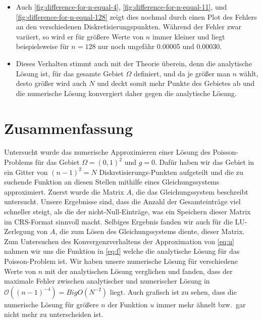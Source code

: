 \documentclass{scrartcl}
\newcommand\BigO{\mathcal{O}}
\begin{document}
\begin{itemize}
    \item Auch \autoref{fig:difference-for-n-equal-4},
          \autoref{fig:difference-for-n-equal-11}, und
          \autoref{fig:difference-for-n-equal-128} zeigt dies nochmal durch
          einen Plot des Fehlers an den verschiedenen Diskretisierungspunkten.
          Während der Fehler zwar variiert, so wird er für größere Werte von
          \(n\) immer kleiner und liegt beispielsweise für \(n = 128\) nur noch
          ungefähr 0.00005 und 0.00030.

    \item Dieses Verhalten stimmt auch mit der Theorie überein, denn die
          analytische Lösung ist, für das gesamte Gebiet \(\Omega\) definiert,
          und da je größer man \(n\) wählt, desto größer wird auch \(N\) und
          deckt somit mehr Punkte des Gebietes ab und die numerische Lösung
          konvergiert daher gegen die analytische Lösung.
\end{itemize}

\section{Zusammenfassung}

Untersucht wurde das numerische Approximieren einer Lösung des Poisson-Problems
für das Gebiet \(\Omega = {(0, 1)}^2\) und \(g = 0\). Dafür haben wir das
Gebiet in ein Gitter von \({(n - 1)}^2 = N\) Diskretisierungs-Punkten
aufgeteilt und die zu suchende Funktion an diesen Stellen mithilfe eines
Gleichungssystems approximiert. Zuerst wurde die Matrix \(A\), die das
Gleichungssystem beschreibt untersucht. Unsere Ergebnisse sind, dass die Anzahl
der Gesamteinträge viel schneller steigt, als die der nicht-Null-Einträge, was
ein Speichern dieser Matrix im CRS-Format sinnvoll macht. Selbiges Ergebnis
fanden wir auch für die LU-Zerlegung von \(A\), die zum Lösen des
Gleichungssystems diente, dieser Matrix. Zum Untersuchen des
Konvergenzverhaltens der Approximation von \autoref{eq:u} nahmen wir uns die
Funktion in \autoref{eq:f} welche die analytische Lösung für das
Poisson-Problem ist. Wir haben unsere numerische Lösung für verschiedene Werte
von \(n\) mit der analytischen Lösung verglichen und fanden, dass der maximale
Fehler zwischen analytischer und numerischer Lösung in \(\BigO({(n - 1)}^{-4})
= BigO(N^{-2})\) liegt. Auch grafisch ist zu sehen, dass die numerische Lösung
für größere \(n\) der Funktion \(u\) immer mehr ähnelt bzw.\ gar nicht mehr zu
unterscheiden ist.

\printbibliography%
\end{document}

